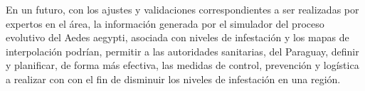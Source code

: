 En un futuro, con los ajustes y validaciones correspondientes a ser realizadas por expertos en el
área, la información generada por el simulador del proceso evolutivo del Aedes aegypti, asociada
con niveles de infestación y los mapas de interpolación podrían, permitir a las autoridades
sanitarias, del Paraguay, definir y planificar, de forma más efectiva, las medidas de control,
prevención y logística a realizar con con el fin de disminuir los niveles de infestación en una
región.

